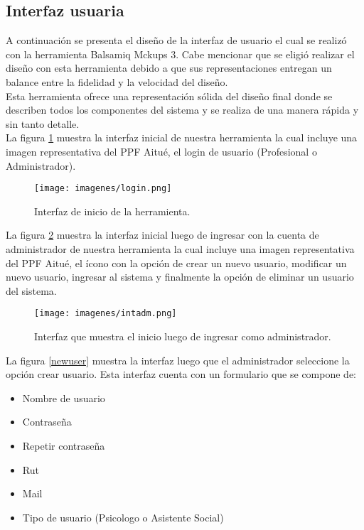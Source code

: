 \subsection{Interfaz usuaria}

A continuación se presenta el diseño de la interfaz de usuario el cual se realizó con la herramienta Balsamiq Mckups 3. Cabe mencionar que se eligió realizar el diseño con esta herramienta debido a que sus representaciones entregan un balance entre la fidelidad y la velocidad del diseño. \\
Esta herramienta ofrece una representación sólida del diseño final donde se describen todos los componentes del sistema y se realiza de una manera rápida y sin tanto detalle. \\

La figura \ref{intinicio} muestra la interfaz inicial de nuestra herramienta la cual incluye una imagen representativa del PPF Aitué, el login de usuario (Profesional o Administrador).\\

\begin{figure}[h]
	\label{intinicio}
	\begin{center}
		\texttt{[image: imagenes/login.png]}
	\end{center}
	\caption{Interfaz de inicio de la herramienta.}
\end{figure}

\clearpage
\newpage

La figura \ref{intadm} muestra la interfaz inicial luego de ingresar con la cuenta de administrador de nuestra herramienta la cual incluye una imagen representativa del PPF Aitué, el ícono con la opción de crear un nuevo usuario, modificar un nuevo usuario, ingresar al sistema y finalmente la opción de eliminar un usuario del sistema.\\


\begin{figure}[h]
	\label{intadm}
	\begin{center}
		\texttt{[image: imagenes/intadm.png]}
	\end{center}
	\caption{Interfaz que muestra el inicio luego de ingresar como administrador.}
\end{figure}

\clearpage
\newpage

La figura \ref{newuser} muestra la interfaz luego que el administrador seleccione la opción crear usuario. Esta interfaz cuenta con un formulario que se compone de:
\begin{itemize}
	\item Nombre de usuario
	\item Contraseña
	\item Repetir contraseña
	\item Rut
	\item Mail
	\item Tipo de usuario (Psicologo o Asistente Social)
\end{itemize}

